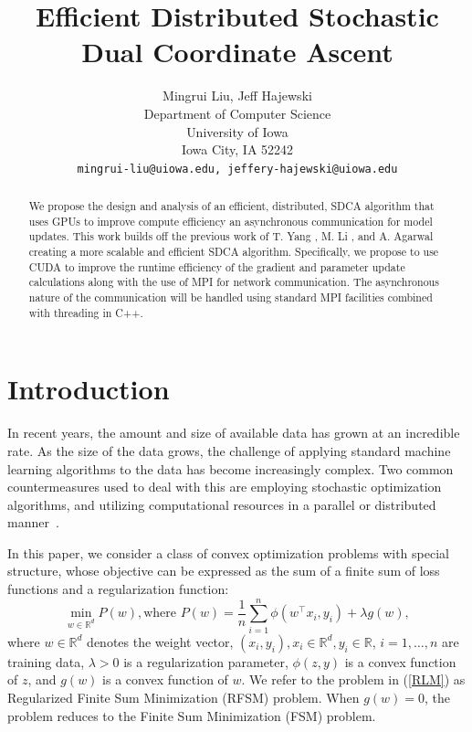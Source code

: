 \documentclass{article}
\title{Efficient Distributed Stochastic Dual Coordinate Ascent}
\author{
  Mingrui Liu, Jeff Hajewski \\
  Department of Computer Science\\
  University of Iowa\\
  Iowa City, IA  52242 \\
  \texttt{mingrui-liu@uiowa.edu, jeffery-hajewski@uiowa.edu} \\
}
\def \R {\mathbb{R}}
\def \R {\mathbb{R}}
\begin{document}

\maketitle

\begin{abstract}
We propose the design and analysis of an efficient, distributed, 
SDCA algorithm that uses GPUs to improve compute efficiency an asynchronous
communication for model updates. This work builds off the previous work of T.
Yang \cite{yang2013trading}, M. Li \cite{li2014scaling}, and A. Agarwal
\cite{agarwal2011distributed} creating a more scalable and efficient SDCA
algorithm. Specifically, we propose to use CUDA to improve the runtime
efficiency of the gradient and parameter update calculations along with the use
of MPI for network communication. The asynchronous nature of the communication
will be handled using standard MPI facilities combined with threading in C++.
\end{abstract}

\section{Introduction}
In recent years, the amount and size of available data has grown at an
incredible rate. As the size of the data grows, the challenge of applying
standard machine learning algorithms to the data has become increasingly
complex. Two common countermeasures used to deal with this are employing
stochastic optimization algorithms, and utilizing computational resources in a
parallel or distributed manner~\cite{boyd2011distributed}. 

In this paper, we consider a class of convex optimization problems with special
structure, whose objective can be expressed as the sum of a finite sum of loss
functions and a regularization function: \begin{equation}
\label{RLM}
	\min_{w\in\R^d}P(w), \text{where }P(w)=\frac{1}{n}\sum_{i=1}^{n}\phi(w^\top x_i,y_i)+\lambda g(w),
\end{equation}
where $w\in\R^d$ denotes the weight vector, $(x_i,y_i),x_i\in\R^d,y_i\in\R$,
$i=1,\ldots,n$ are training data, $\lambda>0$ is a regularization parameter,
$\phi(z,y)$ is a convex function of $z$, and $g(w)$ is a convex function of $w$.
We refer to the problem in (\ref{RLM}) as Regularized Finite Sum Minimization
(RFSM) problem. When $g(w)=0$, the problem reduces to the Finite Sum
Minimization (FSM) problem.
\end{document}
